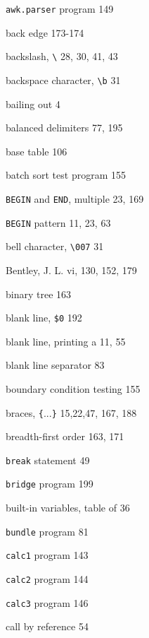 \begin{multicols}{3}
\hangindent=3pc  \verb'awk.parser' program 149

\hangindent=3pc  back edge 173-174

\hangindent=3pc  backslash, \verb'\' 28, 30, 41, 43

\hangindent=3pc  backspace character, \verb'\b' 31

\hangindent=3pc  bailing out 4

\hangindent=3pc  balanced delimiters 77, 195

\hangindent=3pc  base table 106

\hangindent=3pc  batch sort test program 155

\hangindent=3pc  \verb'BEGIN' and \verb'END', multiple 23, 169

\hangindent=3pc  \verb'BEGIN' pattern 11, 23, 63

\hangindent=3pc  bell character, \verb'\007' 31

\hangindent=3pc  Bentley, J. L. vi, 130, 152, 179

\hangindent=3pc  binary tree 163

\hangindent=3pc  blank line, \verb'$0' 192

\hangindent=3pc  blank line, printing a 11, 55

\hangindent=3pc  blank line separator 83

\hangindent=3pc  boundary condition testing 155

\hangindent=3pc  braces, \verb'{'...\verb'}' 15,22,47, 167, 188

\hangindent=3pc  breadth-first order 163, 171

\hangindent=3pc  \verb'break' statement 49

\hangindent=3pc  \verb'bridge' program 199

\hangindent=3pc  built-in variables, table of 36

\hangindent=3pc  \verb'bundle' program 81

\hangindent=3pc  \verb'calc1' program 143

\hangindent=3pc  \verb'calc2' program 144

\hangindent=3pc  \verb'calc3' program 146

\hangindent=3pc  call by reference 54


\end{multicols}
